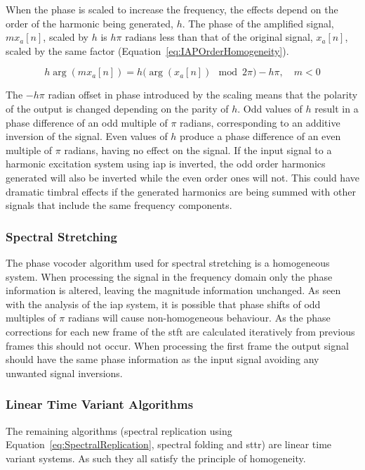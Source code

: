 			When the phase is scaled to increase the frequency, the effects depend on the order of the harmonic
			being generated, $h$. The phase of the amplified signal, $mx_{a}[n]$, scaled by $h$ is $h\pi$
			radians less than that of the original signal, $x_{a}[n]$, scaled by the same factor
			(Equation~\ref{eq:IAPOrderHomogeneity}).

			\begin{equation}
				h\arg(mx_{a}[n]) = h \bigl( \arg(x_{a}[n]) \mod 2\pi \bigr) - h\pi, \quad m < 0
				\label{eq:IAPOrderHomogeneity}
			\end{equation}

			The $-h\pi$ radian offset in phase introduced by the scaling means that the polarity of the output
			is changed depending on the parity of $h$. Odd values of $h$ result in a phase difference of an odd
			multiple of $\pi$ radians, corresponding to an additive inversion of the signal. Even values of $h$
			produce a phase difference of an even multiple of $\pi$ radians, having no effect on the signal. If
			the input signal to a harmonic excitation system using \acrshort{iap} is inverted, the odd order
			harmonics generated will also be inverted while the even order ones will not. This could have
			dramatic timbral effects if the generated harmonics are being summed with other signals that
			include the same frequency components.

		\subsubsection*{Spectral Stretching}
			The phase vocoder algorithm used for spectral stretching is a homogeneous system. When processing
			the signal in the frequency domain only the phase information is altered, leaving the magnitude
			information unchanged. As seen with the analysis of the \acrshort{iap} system, it is possible that
			phase shifts of odd multiples of $\pi$ radians will cause non-homogeneous behaviour. As the phase
			corrections for each new frame of the \acrshort{stft} are calculated iteratively from previous
			frames this should not occur. When processing the first frame the output signal should have the
			same phase information as the input signal avoiding any unwanted signal inversions.

		\subsubsection*{Linear Time Variant Algorithms}
			The remaining algorithms (spectral replication using Equation~\ref{eq:SpectralReplication},
			spectral folding and \acrshort{sttr}) are linear time variant systems. As such they all satisfy the
			principle of homogeneity.


